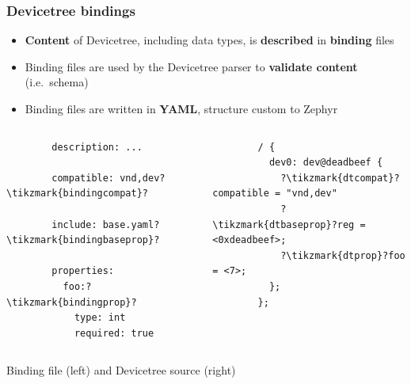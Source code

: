 \documentclass[handout]{beamer}
\begin{document}
\begin{frame}[fragile]
  \frametitle{Devicetree bindings}

  \begin{itemize}
    \item \textbf{Content} of Devicetree, including data types, is
          \textbf{described} in \textbf{binding} files
    \item Binding files are used by the Devicetree parser to
          \textbf{validate content} (i.e.\ schema)
    \item Binding files are written in \textbf{YAML}, structure custom to
          Zephyr
  \end{itemize}

  \begin{listing}[H]
    \begin{columns}
      \begin{column}{0.5\textwidth}
        \begin{verbatim}
        description: ...

        compatible: vnd,dev?\tikzmark{bindingcompat}?

        include: base.yaml?\tikzmark{bindingbaseprop}?

        properties:
          foo:?\tikzmark{bindingprop}?
            type: int
            required: true
      \end{verbatim}
      \end{column}
      \begin{column}{0.5\textwidth}
        \begin{verbatim}
        / {
          dev0: dev@deadbeef {
            ?\tikzmark{dtcompat}?compatible = "vnd,dev"
            ?\tikzmark{dtbaseprop}?reg = <0xdeadbeef>;
            ?\tikzmark{dtprop}?foo = <7>;
          };
        };
      \end{verbatim}
      \end{column}
    \end{columns}
    \caption{Binding file (left) and Devicetree source (right)}
  \end{listing}

\end{frame}
\end{document}

